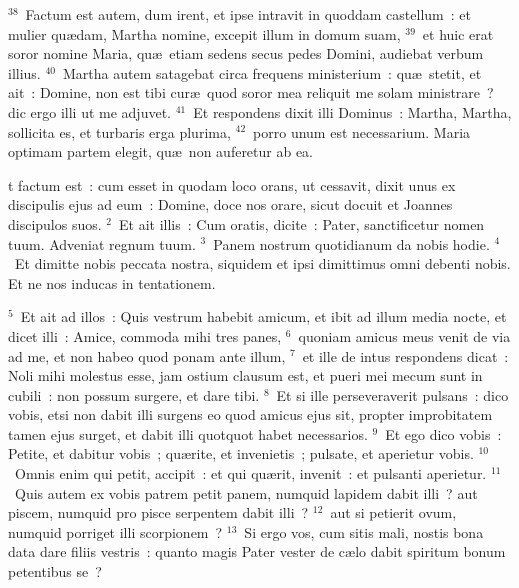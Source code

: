 ${}^{38}$~Factum est autem, dum irent, et ipse intravit in quoddam castellum~: et mulier qu\ae dam, Martha nomine, excepit illum in domum suam,
${}^{39}$~et huic erat soror nomine Maria, qu\ae\ etiam sedens secus pedes Domini, audiebat verbum illius.
${}^{40}$~Martha autem satagebat circa frequens ministerium~: qu\ae\ stetit, et ait~: Domine, non est tibi cur\ae\ quod soror mea reliquit me solam ministrare~? dic ergo illi ut me adjuvet.
${}^{41}$~Et respondens dixit illi Dominus~: Martha, Martha, sollicita es, et turbaris erga plurima,
${}^{42}$~porro unum est necessarium. Maria optimam partem elegit, qu\ae\ non auferetur ab ea.

\bchapter
{}t factum est~: cum esset in quodam loco orans, ut cessavit, dixit unus ex discipulis ejus ad eum~: Domine, doce nos orare, sicut docuit et Joannes discipulos suos.
${}^{2}$~Et ait illis~: Cum oratis, dicite~: Pater, sanctificetur nomen tuum. Adveniat regnum tuum.
${}^{3}$~Panem nostrum quotidianum da nobis hodie.
${}^{4}$~Et dimitte nobis peccata nostra, siquidem et ipsi dimittimus omni debenti nobis. Et ne nos inducas in tentationem.


${}^{5}$~Et ait ad illos~: Quis vestrum habebit amicum, et ibit ad illum media nocte, et dicet illi~: Amice, commoda mihi tres panes,
${}^{6}$~quoniam amicus meus venit de via ad me, et non habeo quod ponam ante illum,
${}^{7}$~et ille de intus respondens dicat~: Noli mihi molestus esse, jam ostium clausum est, et pueri mei mecum sunt in cubili~: non possum surgere, et dare tibi.
${}^{8}$~Et si ille perseveraverit pulsans~: dico vobis, etsi non dabit illi surgens eo quod amicus ejus sit, propter improbitatem tamen ejus surget, et dabit illi quotquot habet necessarios.
${}^{9}$~Et ego dico vobis~: Petite, et dabitur vobis~; qu\ae rite, et invenietis~; pulsate, et aperietur vobis.
${}^{10}$~Omnis enim qui petit, accipit~: et qui qu\ae rit, invenit~: et pulsanti aperietur.
${}^{11}$~Quis autem ex vobis patrem petit panem, numquid lapidem dabit illi~? aut piscem, numquid pro pisce serpentem dabit illi~?
${}^{12}$~aut si petierit ovum, numquid porriget illi scorpionem~?
${}^{13}$~Si ergo vos, cum sitis mali, nostis bona data dare filiis vestris~: quanto magis Pater vester de c\ae lo dabit spiritum bonum petentibus se~?


